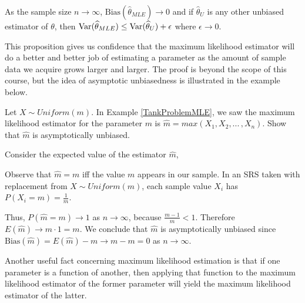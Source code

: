 \begin{prop} As the sample size $n \to \infty$, $\text{Bias}(\widehat{\theta}_{MLE}) \to 0$ and if $\widehat{\theta}_{U}$ is any other unbiased estimator of $\theta$, then $\operatorname{Var}(\widehat{\theta}_{MLE}) \leq \operatorname{Var}(\widehat{\theta}_{U}) + \epsilon$ where $\epsilon \to 0$.
\end{prop}

This proposition gives us confidence that the maximum likelihood estimator will do a better and better job of estimating a parameter as the amount of sample data we acquire grows larger and larger. The proof is beyond the scope of this course, but the idea of asymptotic unbiasedness is illustrated in the example below.
\begin{examp} Let $X \sim Uniform(m)$. In Example \ref{TankProblemMLE}, we saw the maximum likelihood estimator for the parameter $m$ is $\widehat{m} = max(X_1,X_2,...\,,X_n)$. Show that $\widehat{m}$ is asymptotically unbiased.
\par
\noindent Consider the expected value of the estimator $\widehat{m}$,
\par
\noindent Observe that $\widehat{m} =  m$ iff the value $m$ appears in our sample. In an SRS taken with replacement from $X \sim Uniform(m)$, each sample value $X_i$ has $P(X_i = m) = \frac{1}{m}$.
\par
\noindent Thus, $P(\widehat{m} = m) \to 1$ as $n \to \infty$, because $\frac{m-1}{m} < 1$. Therefore $E(\widehat{m}) \to m \cdot 1 = m$. We conclude that $\widehat{m}$ is asymptotically unbiased since $\text{Bias}(\widehat{m}) = E(\widehat{m}) - m  \to m - m = 0$ as $n \to \infty$.
\end{examp}
\par
Another useful fact concerning maximum likelihood estimation is that if one parameter is a function of another, then applying that function to the maximum likelihood estimator of the former parameter will yield the maximum likelihood estimator of the latter.

